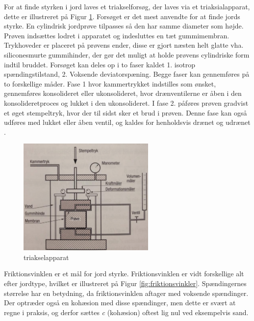 For at finde styrken i jord laves et triakselforsøg, der laves via et triaksialapparat, dette er illustreret på Figur \ref{fig:forskudningsspanding}. Forsøget er det mest anvendte for at finde jords styrke. En cylindrisk jordprøve tilpasses så den har samme diameter som højde. Prøven indsættes lodret i apparatet og indesluttes en tæt gummimembran. Trykhoveder er placeret på prøvens ender, disse er gjort næsten helt glatte vha. siliconesmurte gummihinder, der gør det muligt at holde prøvens cylindriske form indtil bruddet.  
\newline \indent{     } Forsøget kan deles op i to faser kaldet 1. isotrop spændingstilstand, 2. Voksende deviatorspæning. Begge faser kan gennemføres på to forskellige måder. Fase 1 hvor kammertrykket indstilles som ønsket, gennemføres konsolideret eller ukonsolideret, hvor drænventilerne er åben i den konsolideretproces og lukket i den ukonsolideret. I fase 2. påføres prøven gradvist et øget stempeltryk, hvor der til sidst sker et brud i prøven. Denne fase kan også udføres med lukket eller åben ventil, og kaldes for henholdsvis drænet og udrænet \citep{geoteknik}.

\begin{figure}[htbp]
	\centering
	\includegraphics[width=0.6\textwidth]{billeder/forskud.png}
	\caption{triakselapparat \citep{geoteknik}}
	\label{fig:forskudningsspanding}
\end{figure}

\indent{     } 																																																																																																																																																																																						 Friktionsvinklen er et mål for jord styrke. Friktionsvinklen er vidt forskellige alt efter jordtype, hvilket er illustreret på Figur \ref{fig:friktionsvinkler}. Spændingernes størrelse har en betydning, da friktionsvinklen aftager med voksende spændinger. Der optræder også en kohæsion med disse spændinger, men dette er svært at regne i praksis, og derfor sættes \textit{c} (kohæsion) oftest lig nul ved eksempelvis sand. 

